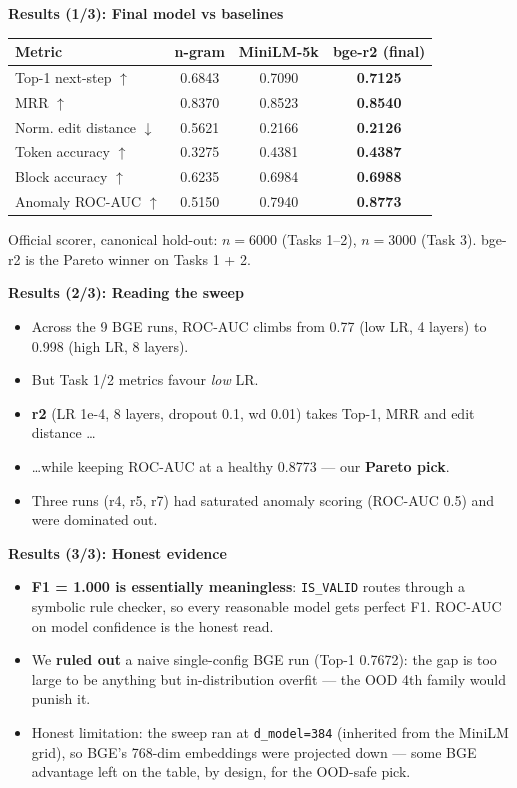 \documentclass[12pt]{article}
\newcommand{\slide}[2]{%
  \begingroup
  {\color{navy}\Huge\bfseries #1\par}%
  \vspace{2pt}{\color{accent}\rule{\linewidth}{2pt}}\par
  \vspace{14pt}\Large #2
  \endgroup
  \clearpage}
\begin{document}
\slide{Results (1/3): Final model vs baselines}{
\begin{center}
\large
\begin{tabular}{lccc}
  \toprule
  Metric & n-gram & MiniLM-5k & \textbf{bge-r2 (final)} \\
  \midrule
  Top-1 next-step $\uparrow$       & 0.6843 & 0.7090 & \textbf{0.7125} \\
  MRR $\uparrow$                   & 0.8370 & 0.8523 & \textbf{0.8540} \\
  Norm. edit distance $\downarrow$ & 0.5621 & 0.2166 & \textbf{0.2126} \\
  Token accuracy $\uparrow$        & 0.3275 & 0.4381 & \textbf{0.4387} \\
  Block accuracy $\uparrow$        & 0.6235 & 0.6984 & \textbf{0.6988} \\
  Anomaly ROC-AUC $\uparrow$       & 0.5150 & 0.7940 & \textbf{0.8773} \\
  \bottomrule
\end{tabular}
\end{center}
\vspace{10pt}
\normalsize Official scorer, canonical hold-out: $n=6000$ (Tasks 1--2), $n=3000$ (Task 3). bge-r2 is the Pareto winner on Tasks 1 + 2.}

\slide{Results (2/3): Reading the sweep}{
\begin{itemize}
  \item Across the 9 BGE runs, ROC-AUC climbs from 0.77 (low LR, 4 layers) to 0.998 (high LR, 8 layers).
  \item But Task 1/2 metrics favour \emph{low} LR.
  \item \textbf{r2} (LR 1e-4, 8 layers, dropout 0.1, wd 0.01) takes Top-1, MRR and edit distance \dots
  \item \dots while keeping ROC-AUC at a healthy 0.8773 --- our \textbf{Pareto pick}.
  \item Three runs (r4, r5, r7) had saturated anomaly scoring (ROC-AUC 0.5) and were dominated out.
\end{itemize}}

\slide{Results (3/3): Honest evidence}{
\begin{itemize}
  \item \textbf{F1 = 1.000 is essentially meaningless}: \texttt{IS\_VALID} routes through a symbolic rule checker, so every reasonable model gets perfect F1. ROC-AUC on model confidence is the honest read.
  \item We \textbf{ruled out} a naive single-config BGE run (Top-1 0.7672): the gap is too large to be anything but in-distribution overfit --- the OOD 4th family would punish it.
  \item Honest limitation: the sweep ran at \texttt{d\_model=384} (inherited from the MiniLM grid), so BGE's 768-dim embeddings were projected down --- some BGE advantage left on the table, by design, for the OOD-safe pick.
\end{itemize}}
\end{document}
